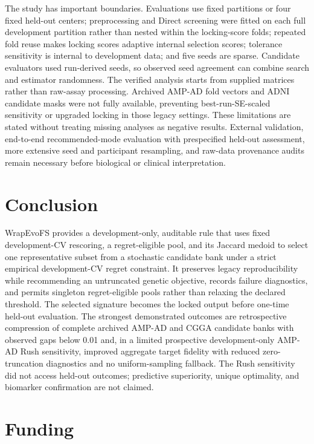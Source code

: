 The study has important boundaries. Evaluations use fixed partitions or four fixed held-out centers; preprocessing and Direct screening were fitted on each full development partition rather than nested within the locking-score folds; repeated fold reuse makes locking scores adaptive internal selection scores; tolerance sensitivity is internal to development data; and five seeds are sparse. Candidate evaluators used run-derived seeds, so observed seed agreement can combine search and estimator randomness. The verified analysis starts from supplied matrices rather than raw-assay processing. Archived AMP-AD fold vectors and ADNI candidate masks were not fully available, preventing best-run-SE-scaled sensitivity or upgraded locking in those legacy settings. These limitations are stated without treating missing analyses as negative results. External validation, end-to-end recommended-mode evaluation with prespecified held-out assessment, more extensive seed and participant resampling, and raw-data provenance audits remain necessary before biological or clinical interpretation.

\FloatBarrier
\section{Conclusion}

WrapEvoFS provides a development-only, auditable rule that uses fixed development-CV rescoring, a regret-eligible pool, and its Jaccard medoid to select one representative subset from a stochastic candidate bank under a strict empirical development-CV regret constraint. It preserves legacy reproducibility while recommending an untruncated genetic objective, records failure diagnostics, and permits singleton regret-eligible pools rather than relaxing the declared threshold. The selected signature becomes the locked output before one-time held-out evaluation. The strongest demonstrated outcomes are retrospective compression of complete archived AMP-AD and CGGA candidate banks with observed gaps below 0.01 and, in a limited prospective development-only AMP-AD Rush sensitivity, improved aggregate target fidelity with reduced zero-truncation diagnostics and no uniform-sampling fallback. The Rush sensitivity did not access held-out outcomes; predictive superiority, unique optimality, and biomarker confirmation are not claimed.

\FloatBarrier
\section{Funding}

